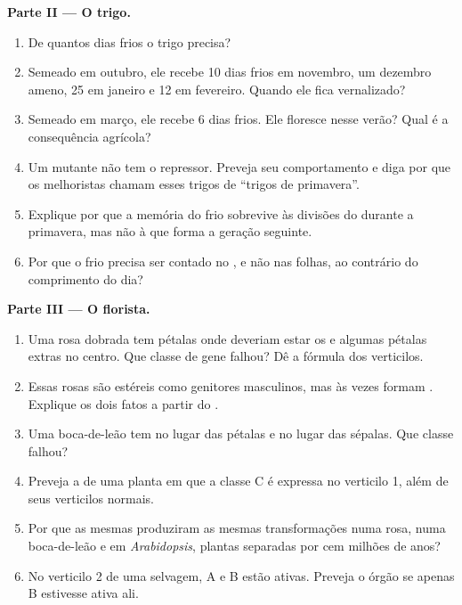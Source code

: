\begin{problem}
\medskip
\noindent\textbf{Parte II --- O trigo.}
\begin{enumerate}[resume]
  \item De quantos dias frios o trigo precisa?
  \item Semeado em outubro, ele recebe 10 dias frios em novembro, um
        dezembro ameno, 25 em janeiro e 12 em fevereiro. Quando ele fica
        vernalizado?
  \item Semeado em março, ele recebe 6 dias frios. Ele floresce nesse
        verão? Qual é a consequência agrícola?
  \item Um mutante não tem o repressor. Preveja seu comportamento e
        diga por que os melhoristas chamam esses trigos de ``trigos de
        primavera''.
  \item Explique por que a memória do frio sobrevive às divisões do
         durante a primavera, mas não à  que forma a
        geração seguinte.
  \item Por que o frio precisa ser contado no , e não nas
        folhas, ao contrário do comprimento do dia?
\end{enumerate}

\medskip
\noindent\textbf{Parte III --- O florista.}
\begin{enumerate}[resume]
  \item Uma rosa dobrada tem pétalas onde deveriam estar os  e
        algumas pétalas extras no centro. Que classe de gene falhou? Dê
        a fórmula dos verticilos.
  \item Essas rosas são estéreis como genitores masculinos, mas às vezes
        formam . Explique os dois fatos a partir do .
  \item Uma boca-de-leão tem  no lugar das pétalas e  no
        lugar das sépalas. Que classe falhou?
  \item Preveja a  de uma planta em que a classe C é expressa no
        verticilo 1, além de seus verticilos normais.
  \item Por que as mesmas  produziram as mesmas transformações
        numa rosa, numa boca-de-leão e em \emph{Arabidopsis}, plantas
        separadas por cem milhões de anos?
  \item No verticilo 2 de uma  selvagem, A e B estão ativas. Preveja
        o órgão se apenas B estivesse ativa ali.
\end{enumerate}


\end{problem}
